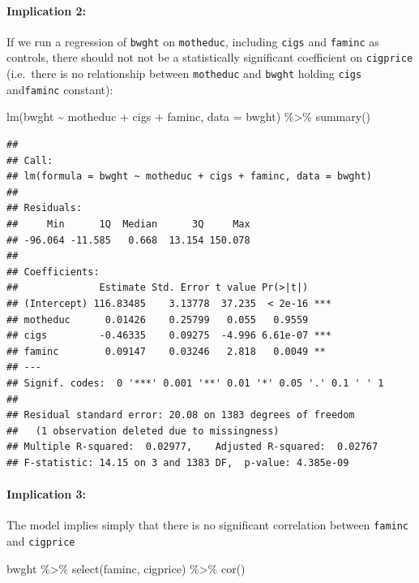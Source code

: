 \documentclass[
]{article}
\newenvironment{Shaded}{\begin{snugshade}}{\end{snugshade}}
\newcommand{\AttributeTok}[1]{\textcolor[rgb]{0.77,0.63,0.00}{#1}}
\newcommand{\FunctionTok}[1]{\textcolor[rgb]{0.00,0.00,0.00}{#1}}
\newcommand{\NormalTok}[1]{#1}
\newcommand{\SpecialCharTok}[1]{\textcolor[rgb]{0.00,0.00,0.00}{#1}}
\begin{document}
\hypertarget{implication-2}{%
\paragraph{Implication 2:}\label{implication-2}}

If we run a regression of \texttt{bwght} on \texttt{motheduc}, including
\texttt{cigs} and \texttt{faminc} as controls, there should not not be a
statistically significant coefficient on \texttt{cigprice} (i.e.~there
is no relationship between \texttt{motheduc} and \texttt{bwght} holding
\texttt{cigs} and\texttt{faminc} constant):

\begin{Shaded}
\begin{Highlighting}[]
\FunctionTok{lm}\NormalTok{(bwght }\SpecialCharTok{\textasciitilde{}}\NormalTok{ motheduc }\SpecialCharTok{+}\NormalTok{ cigs }\SpecialCharTok{+}\NormalTok{ faminc, }\AttributeTok{data =}\NormalTok{ bwght) }\SpecialCharTok{\%\textgreater{}\%} \FunctionTok{summary}\NormalTok{()}
\end{Highlighting}
\end{Shaded}

\begin{verbatim}
## 
## Call:
## lm(formula = bwght ~ motheduc + cigs + faminc, data = bwght)
## 
## Residuals:
##     Min      1Q  Median      3Q     Max 
## -96.064 -11.585   0.668  13.154 150.078 
## 
## Coefficients:
##              Estimate Std. Error t value Pr(>|t|)    
## (Intercept) 116.83485    3.13778  37.235  < 2e-16 ***
## motheduc      0.01426    0.25799   0.055   0.9559    
## cigs         -0.46335    0.09275  -4.996 6.61e-07 ***
## faminc        0.09147    0.03246   2.818   0.0049 ** 
## ---
## Signif. codes:  0 '***' 0.001 '**' 0.01 '*' 0.05 '.' 0.1 ' ' 1
## 
## Residual standard error: 20.08 on 1383 degrees of freedom
##   (1 observation deleted due to missingness)
## Multiple R-squared:  0.02977,    Adjusted R-squared:  0.02767 
## F-statistic: 14.15 on 3 and 1383 DF,  p-value: 4.385e-09
\end{verbatim}

\hypertarget{implication-3}{%
\paragraph{Implication 3:}\label{implication-3}}

The model implies simply that there is no significant correlation
between \texttt{faminc} and \texttt{cigprice}

\begin{Shaded}
\begin{Highlighting}[]
\NormalTok{bwght }\SpecialCharTok{\%\textgreater{}\%}
  \FunctionTok{select}\NormalTok{(faminc, cigprice) }\SpecialCharTok{\%\textgreater{}\%}
  \FunctionTok{cor}\NormalTok{()}
\end{Highlighting}
\end{Shaded}
\end{document}
